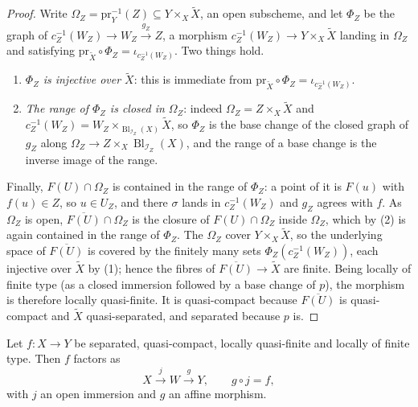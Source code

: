 \begin{proof}
  Write $\Omega_Z=\mathrm{pr}_Y^{-1}(Z)\subseteq Y\times_X\widetilde X$, an open
  subscheme, and let $\Phi_Z$ be the graph of
  $c_Z^{-1}(W_Z)\to W_Z\xrightarrow{g_Z}Z$, a morphism
  $c_Z^{-1}(W_Z)\to Y\times_X\widetilde X$ landing in $\Omega_Z$ and satisfying
  $\mathrm{pr}_{\widetilde X}\circ\Phi_Z=\iota_{c_Z^{-1}(W_Z)}$.  Two things
  hold.
  \begin{enumerate}
    \item \emph{$\Phi_Z$ is injective over $\widetilde X$}: this is immediate
      from $\mathrm{pr}_{\widetilde X}\circ\Phi_Z=\iota_{c_Z^{-1}(W_Z)}$.
    \item \emph{The range of $\Phi_Z$ is closed in $\Omega_Z$}: indeed
      $\Omega_Z=Z\times_X\widetilde X$ and
      $c_Z^{-1}(W_Z)=W_Z\times_{\operatorname{Bl}_{\mathcal I_Z}(X)}\widetilde X$,
      so $\Phi_Z$ is the base change of the closed graph of $g_Z$ along
      $\Omega_Z\to Z\times_X\operatorname{Bl}_{\mathcal I_Z}(X)$, and the range
      of a base change is the inverse image of the range.
  \end{enumerate}

  Finally, $F(U)\cap\Omega_Z$ is contained in the range of $\Phi_Z$: a point of
  it is $F(u)$ with $f(u)\in Z$, so $u\in U_Z$, and there $\sigma$ lands in
  $c_Z^{-1}(W_Z)$ and $g_Z$ agrees with $f$.  As $\Omega_Z$ is open,
  $\overline{F(U)}\cap\Omega_Z$ is the closure of $F(U)\cap\Omega_Z$ inside
  $\Omega_Z$, which by (2) is again contained in the range of $\Phi_Z$.  The
  $\Omega_Z$ cover $Y\times_X\widetilde X$, so the underlying space of
  $\overline{F(U)}$ is covered by the finitely many sets $\Phi_Z(c_Z^{-1}(W_Z))$,
  each injective over $\widetilde X$ by (1); hence the fibres of
  $\overline{F(U)}\to\widetilde X$ are finite.  Being locally of finite type
  (as a closed immersion followed by a base change of $p$), the morphism is
  therefore locally quasi-finite.  It is quasi-compact because
  $\overline{F(U)}$ is quasi-compact and $\widetilde X$ quasi-separated, and
  separated because $p$ is.
\end{proof}

\begin{lemma}
  \label{lemma:nagata-zmt-open-immersion-affine-factorization}
  \leanok

  Let $f\colon X\to Y$ be separated, quasi-compact, locally quasi-finite and
  locally of finite type.  Then $f$ factors as
  \[
    X\xrightarrow{\;j\;}W\xrightarrow{\;g\;}Y,\qquad g\circ j=f,
  \]
  with $j$ an open immersion and $g$ an affine morphism.
\end{lemma}

